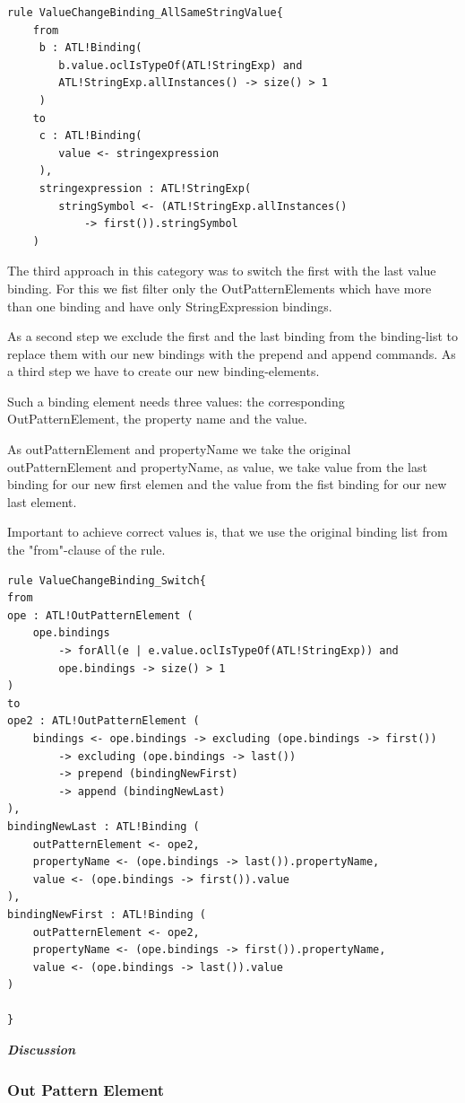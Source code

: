 \documentclass{llncs}
\begin{document}
\begin{lstlisting}
rule ValueChangeBinding_AllSameStringValue{
	from
	 b : ATL!Binding(
	 	b.value.oclIsTypeOf(ATL!StringExp) and 
		ATL!StringExp.allInstances() -> size() > 1
	 )
	to
	 c : ATL!Binding(
	 	value <- stringexpression
	 ), 
	 stringexpression : ATL!StringExp(
	 	stringSymbol <- (ATL!StringExp.allInstances() 
			-> first()).stringSymbol
	)
\end{lstlisting}

The third approach in this category was to switch the first with the last value binding. For this we fist filter only the OutPatternElements which have more than one binding and have only StringExpression bindings.

As a second step we exclude the first and the last binding from the binding-list to replace them with our new bindings with the prepend and append commands. As a third step we have to create our new binding-elements.

Such a binding element needs three values: the corresponding OutPatternElement, the property name and the value.

As outPatternElement and propertyName we take the original outPatternElement and propertyName, as value, we take value from the last binding for our new first elemen and the value from the fist binding for our new last element.

Important to achieve correct values is, that we use the original binding list from the "from"-clause of the rule.

\begin{lstlisting}
rule ValueChangeBinding_Switch{
from
ope : ATL!OutPatternElement (
	ope.bindings 
		-> forAll(e | e.value.oclIsTypeOf(ATL!StringExp)) and
		ope.bindings -> size() > 1
)
to
ope2 : ATL!OutPatternElement (
	bindings <- ope.bindings -> excluding (ope.bindings -> first()) 
		-> excluding (ope.bindings -> last())
		-> prepend (bindingNewFirst)
		-> append (bindingNewLast)
), 
bindingNewLast : ATL!Binding (
	outPatternElement <- ope2, 
	propertyName <- (ope.bindings -> last()).propertyName,
	value <- (ope.bindings -> first()).value
),
bindingNewFirst : ATL!Binding (
	outPatternElement <- ope2,
	propertyName <- (ope.bindings -> first()).propertyName,
	value <- (ope.bindings -> last()).value	
)
	
}
\end{lstlisting}

\textbf\textit{{Discussion}}

\subsubsection{Out Pattern Element}
\end{document}
